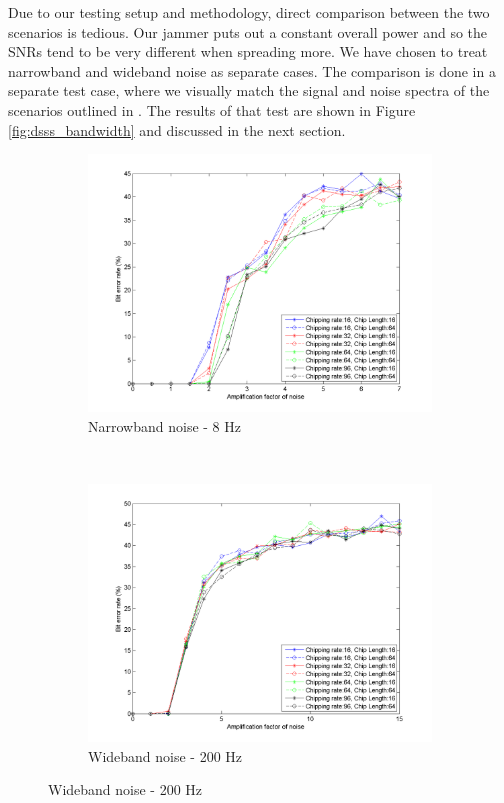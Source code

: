 			Due to our testing setup and methodology, direct comparison between the two scenarios is tedious.
			Our jammer puts out a constant overall power and so the SNRs tend to be very different when spreading more.
			We have chosen to treat narrowband and wideband noise as separate cases.
			The comparison is done in a separate test case, where we visually match the signal and noise spectra of the scenarios outlined in \cite{ISS}.
			The results of that test are shown in Figure \ref{fig:dsss_bandwidth} and discussed in the next section.
				\begin{figure}[H]
					\centering
				    \begin{subfigure}[b]{0.5\textwidth}
						\includegraphics[width=\textwidth]{imgs/results/plot_mode_dsss-test_narrowband-rep_20-dataRate_8-dataLength_128.png}
						\caption{Narrowband noise - 8 Hz}
						\label{fig:dsss_narrowband}
					\end{subfigure}%
					~
					\begin{subfigure}[b]{0.5\textwidth}
						\includegraphics[width=\textwidth]{imgs/results/plot_mode_dsss-test_wideband-rep_20-dataRate_8-dataLength_128.png}
						\caption{Wideband noise - 200 Hz}
						\label{fig:dsss_wideband}
					\end{subfigure}
				\end{figure}
				
